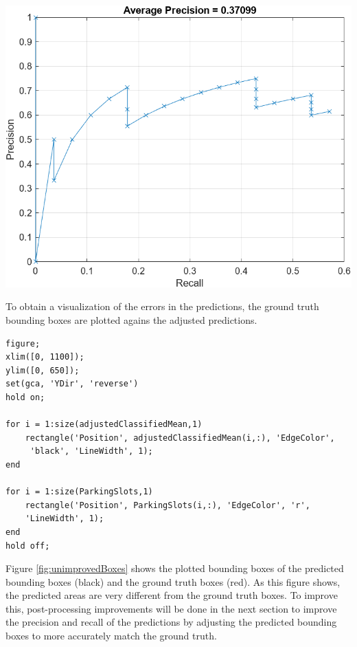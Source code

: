 \documentclass[man]{apa7}
\begin{document}
\begin{minipage}{\linewidth}
  \includegraphics[height=\textheight/2,width=\textwidth/1]{figures/graph.png}
  \label{fig:adjustedPrecRec2}
\end{minipage}

To obtain a visualization of the errors in the predictions, the ground truth bounding boxes are plotted agains the adjusted predictions.

\begin{lstlisting}[]
figure;
xlim([0, 1100]);
ylim([0, 650]);
set(gca, 'YDir', 'reverse')
hold on;

for i = 1:size(adjustedClassifiedMean,1)
    rectangle('Position', adjustedClassifiedMean(i,:), 'EdgeColor',
     'black', 'LineWidth', 1);
end

for i = 1:size(ParkingSlots,1)
    rectangle('Position', ParkingSlots(i,:), 'EdgeColor', 'r', 
    'LineWidth', 1);
end
hold off;
\end{lstlisting}

Figure \ref{fig:unimprovedBoxes} shows the plotted bounding boxes of the predicted bounding boxes (black) and the ground truth boxes (red). As this figure shows, the predicted areas are very different from the ground truth boxes. To improve this, post-processing improvements will be done in the next section to improve the precision and recall of the predictions by adjusting the predicted bounding boxes to more accurately match the ground truth.

\newpage
\end{document}
